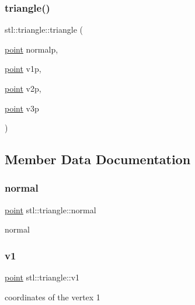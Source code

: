 \subsubsection{\texorpdfstring{triangle()}{triangle()}}
{\footnotesize\ttfamily stl\+::triangle\+::triangle (\begin{DoxyParamCaption}\item[{\mbox{\hyperlink{structstl_1_1point}{point}}}]{normalp,  }\item[{\mbox{\hyperlink{structstl_1_1point}{point}}}]{v1p,  }\item[{\mbox{\hyperlink{structstl_1_1point}{point}}}]{v2p,  }\item[{\mbox{\hyperlink{structstl_1_1point}{point}}}]{v3p }\end{DoxyParamCaption})\hspace{0.3cm}{\ttfamily [inline]}}



\subsection{Member Data Documentation}
\mbox{\label{structstl_1_1triangle_ac17e971a0bd58456d74eb5507d1daa86}} 
\subsubsection{\texorpdfstring{normal}{normal}}
{\footnotesize\ttfamily \mbox{\hyperlink{structstl_1_1point}{point}} stl\+::triangle\+::normal}

normal \mbox{\label{structstl_1_1triangle_a8fda6f22f6e1f7064c3981696817e7f4}} 
\subsubsection{\texorpdfstring{v1}{v1}}
{\footnotesize\ttfamily \mbox{\hyperlink{structstl_1_1point}{point}} stl\+::triangle\+::v1}

coordinates of the vertex 1 \mbox{\label{structstl_1_1triangle_af767f5dd74a671bc24e3a246f241aad0}} 
